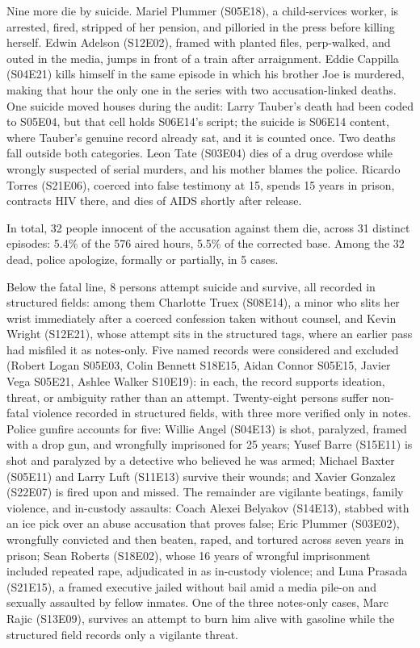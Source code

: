 \documentclass[
]{article}
\begin{document}
Nine more die by suicide. Mariel Plummer (S05E18), a child-services
worker, is arrested, fired, stripped of her pension, and pilloried in
the press before killing herself. Edwin Adelson (S12E02), framed with
planted files, perp-walked, and outed in the media, jumps in front of a
train after arraignment. Eddie Cappilla (S04E21) kills himself in the
same episode in which his brother Joe is murdered, making that hour the
only one in the series with two accusation-linked deaths. One suicide
moved houses during the audit: Larry Tauber's death had been coded to
S05E04, but that cell holds S06E14's script; the suicide is S06E14
content, where Tauber's genuine record already sat, and it is counted
once. Two deaths fall outside both categories. Leon Tate (S03E04) dies
of a drug overdose while wrongly suspected of serial murders, and his
mother blames the police. Ricardo Torres (S21E06), coerced into false
testimony at 15, spends 15 years in prison, contracts HIV there, and
dies of AIDS shortly after release.

In total, 32 people innocent of the accusation against them die, across
31 distinct episodes: 5.4\% of the 576 aired hours, 5.5\% of the
corrected base. Among the 32 dead, police apologize, formally or
partially, in 5 cases.

Below the fatal line, 8 persons attempt suicide and survive, all
recorded in structured fields: among them Charlotte Truex (S08E14), a
minor who slits her wrist immediately after a coerced confession taken
without counsel, and Kevin Wright (S12E21), whose attempt sits in the
structured tags, where an earlier pass had misfiled it as notes-only.
Five named records were considered and excluded (Robert Logan S05E03,
Colin Bennett S18E15, Aidan Connor S05E15, Javier Vega S05E21, Ashlee
Walker S10E19): in each, the record supports ideation, threat, or
ambiguity rather than an attempt. Twenty-eight persons suffer non-fatal
violence recorded in structured fields, with three more verified only in
notes. Police gunfire accounts for five: Willie Angel (S04E13) is shot,
paralyzed, framed with a drop gun, and wrongfully imprisoned for 25
years; Yusef Barre (S15E11) is shot and paralyzed by a detective who
believed he was armed; Michael Baxter (S05E11) and Larry Luft (S11E13)
survive their wounds; and Xavier Gonzalez (S22E07) is fired upon and
missed. The remainder are vigilante beatings, family violence, and
in-custody assaults: Coach Alexei Belyakov (S14E13), stabbed with an ice
pick over an abuse accusation that proves false; Eric Plummer (S03E02),
wrongfully convicted and then beaten, raped, and tortured across seven
years in prison; Sean Roberts (S18E02), whose 16 years of wrongful
imprisonment included repeated rape, adjudicated in as in-custody
violence; and Luna Prasada (S21E15), a framed executive jailed without
bail amid a media pile-on and sexually assaulted by fellow inmates. One
of the three notes-only cases, Marc Rajic (S13E09), survives an attempt
to burn him alive with gasoline while the structured field records only
a vigilante threat.
\end{document}
